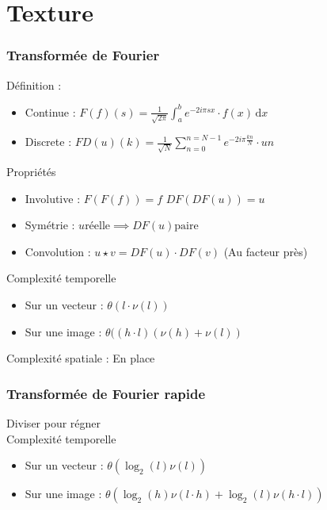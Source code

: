 \documentclass[french]{beamer}
\begin{document}
\section{Texture}

\begin{frame}
	\frametitle{Transformée de Fourier}
	Définition :
	\begin{itemize}
		\item Continue :\; $F(f)(s) = \frac{1}{\sqrt{2\pi}} \int_a^b e^{- 2i\pi sx} \cdot f(x) \, \mathrm dx$ \\
		\item Discrete :\; $FD(u)(k) = \frac{1}{\sqrt{N}} \sum\limits_{n = 0}^{n = N - 1} e^{-2i\pi \frac{kn}{N}} \cdot u{n}$
	\end{itemize}
	Propriétés
	\begin{itemize}
		\item Involutive : $F(F(f)) = f$ \; $DF(DF(u)) = u$
		\item Symétrie : $u \text{réelle} \implies DF(u) \text{paire}$
		\item Convolution : $u \star v = DF(u) \cdot DF(v)$ (Au facteur près)
	\end{itemize}
	Complexité temporelle
	\begin{itemize}
		\item Sur un vecteur : $\theta(l \cdot \nu(l))$
		\item Sur une image : $\theta((h \cdot  l) (\nu(h) + \nu(l))$
	\end{itemize}
	Complexité spatiale : En place

\end{frame}

\begin{frame}[allowframebreaks]
	\frametitle{Transformée de Fourier rapide}
	Diviser pour régner\\
	Complexité temporelle
	\begin{itemize}
		\item Sur un vecteur : $\theta(\log_2(l)\nu(l))$
		\item Sur une image : $\theta(\log_2(h)\nu(l \cdot h) + \log_2(l)\nu(h \cdot l))$
	\end{itemize}
\end{frame}
\end{document}
